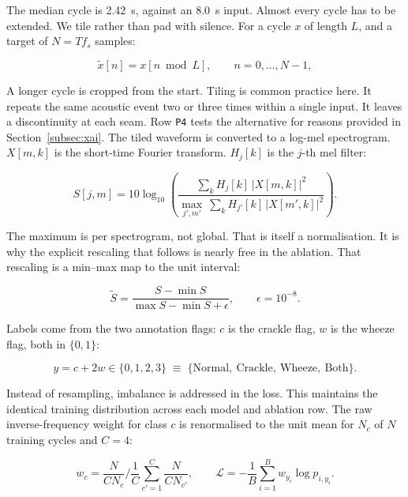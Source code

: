 \documentclass[journal,onecolumn]{IEEEtran}
\begin{document}
The median cycle is 2.42~s, against an 8.0~s input. Almost every cycle has to be
extended. We tile rather than pad with silence. For a cycle $x$ of length $L$, and a
target of $N = T f_s$ samples:

\begin{equation}
\tilde{x}[n] = x[n \bmod L], \qquad n = 0,\dots,N-1,
\label{eq:tile}
\end{equation}

A longer cycle is cropped from the start. Tiling is common practice here. It repeats
the same acoustic event two or three times within a single input. It leaves a
discontinuity at each seam. Row \texttt{P4} tests the alternative for reasons provided
in Section~\ref{subsec:xai}. The tiled waveform is converted to a log-mel spectrogram.
$X[m,k]$ is the short-time Fourier transform. $H_j[k]$ is the $j$-th mel filter:

\begin{equation}
S[j,m] = 10\log_{10}\!\left(\frac{\sum_{k} H_j[k]\,\lvert X[m,k]\rvert^{2}}
{\displaystyle\max_{j',m'}\ \sum_{k} H_{j'}[k]\,\lvert X[m',k]\rvert^{2}}\right).
\label{eq:logmel}
\end{equation}

The maximum is per spectrogram, not global. That is itself a normalisation. It is why
the explicit rescaling that follows is nearly free in the ablation. That rescaling is a
min--max map to the unit interval:

\begin{equation}
\tilde{S} = \frac{S - \min S}{\max S - \min S + \epsilon}, \qquad \epsilon = 10^{-8}.
\label{eq:minmax}
\end{equation}

Labels come from the two annotation flags: $c$ is the crackle flag, $w$ is the wheeze
flag, both in $\{0,1\}$:

\begin{equation}
y = c + 2w \in \{0,1,2,3\} \;\equiv\; \{\text{Normal},\ \text{Crackle},\ \text{Wheeze},\ \text{Both}\}.
\label{eq:label}
\end{equation}

Instead of resampling, imbalance is addressed in the loss. This maintains the
identical training distribution across each model and ablation row. The raw
inverse-frequency weight for class $c$ is renormalised to the unit mean for $N_c$ of
$N$ training cycles and $C = 4$:

\begin{equation}
w_c = \frac{N}{C N_c} \bigg/ \frac{1}{C}\sum_{c'=1}^{C}\frac{N}{C N_{c'}},
\qquad
\mathcal{L} = -\frac{1}{B}\sum_{i=1}^{B} w_{y_i}\log p_{i,y_i}.
\label{eq:weights}
\end{equation}
\end{document}
